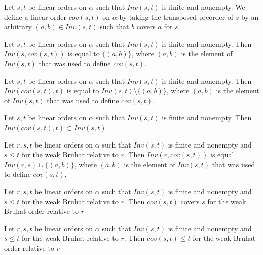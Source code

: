 \begin{subdefi}[CoveringElementBruhatOrder]
Let $s,t$ be linear orders on $\alpha$ such that $Inv(s,t)$ is finite and nonempty. We define a linear order $cov(s,t)$ on $\alpha$ by taking the
transposed preorder of $s$ by an arbitrary $(a,b)\in Inv(s,t)$ such that $b$ covers $a$ for $s$.

\end{subdefi}

\begin{sublemma}
Let $s,t$ be linear orders on $\alpha$ such that $Inv(s,t)$ is finite and nonempty. Then
$Inv(s,cov(s,t))$ is equal to $\{(a,b)\}$, where $(a,b)$ is the element of $Inv(s,t)$ that was used to define $cov(s,t)$. 

\end{sublemma}

\begin{sublemma}
Let $s,t$ be linear orders on $\alpha$ such that $Inv(s,t)$ is finite and nonempty. Then
$Inv(cov(s,t),t)$ is equal to $Inv(s,t)\setminus\{(a,b)\}$, where $(a,b)$ is the element of $Inv(s,t)$ that was used to define $cov(s,t)$. 

\end{sublemma}

\begin{sublemma}
Let $s,t$ be linear orders on $\alpha$ such that $Inv(s,t)$ is finite and nonempty. Then
$Inv(cov(s,t),t)\subset Inv(s,t)$.

\end{sublemma}

\begin{sublemma}
Let $r,s,t$ be linear orders on $\alpha$ such that $Inv(s,t)$ is finite and nonempty and $s\le t$ for the weak Bruhat relative to $r$.
Then $Inv(r,cov(s,t))$ is equal $Inv(r,s)\cup\{(a,b)\}$, where $(a,b)$ is the element of $Inv(s,t)$ that was used to define $cov(s,t)$. 

\end{sublemma}

\begin{sublemma}
Let $r,s,t$ be linear orders on $\alpha$ such that $Inv(s,t)$ is finite and nonempty and $s\le t$ for the weak Bruhat relative to $r$.
Then $cov(s,t)$ covers $s$ for the weak Bruhat order relative to $r$

\end{sublemma}

\begin{sublemma}
Let $r,s,t$ be linear orders on $\alpha$ such that $Inv(s,t)$ is finite and nonempty and $s\le t$ for the weak Bruhat relative to $r$.
Then $cov(s,t)\le t$ for the weak Bruhat order relative to $r$

\end{sublemma}



